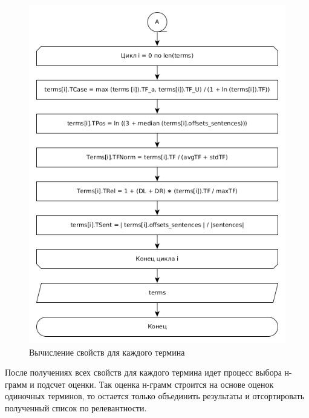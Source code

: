 \begin{figure}[!h]
	\centering
	\includegraphics[width=0.7\linewidth]{src/img/design/calculate_2}
	\caption{Вычисление свойств для каждого термина}
	\label{fig:calculate2}
\end{figure}

После получениях всех свойств для каждого термина идет процесс выбора н-грамм и подсчет оценки.
Так оценка н-грамм строится на основе оценок одиночных терминов, то остается только объединить результаты и отсортировать полученный список по релевантности.


